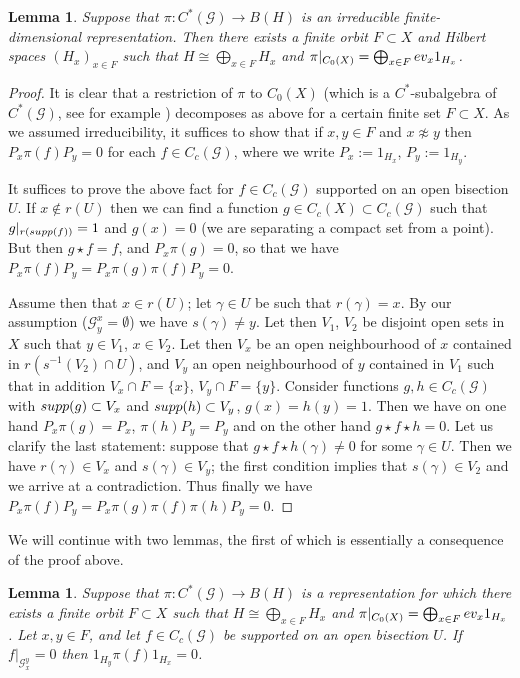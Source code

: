 \documentclass[11 pt, leqno, hidelinks]{amsart}%
\theoremstyle{plain}
\newtheorem{lemma}[theorem]{Lemma}
\numberwithin{equation}{section}
\newcommand{\G}{\mathcal{G}}
\newcommand{\GG}{\mathcal{G}}
\newcommand{\supp}{\textup{supp}}
\begin{document}
\begin{lemma} \label{lem:finiteorbit}
	Suppose  that $\pi:C^*(\GG)\to B(H)$ is an irreducible finite-dimensional representation. Then there exists a finite orbit $F\subset  X$ and Hilbert spaces $(H_x)_{x \in F}$ such that $H \cong \bigoplus_{x\in F} H_x$ and $\pi|_{C_0(X)} = \bigoplus_{x \in F} \textup{ev}_x 1_{H_x}$.
\end{lemma}
\begin{proof}
It is clear that a restriction of $\pi$ to $C_0(X)$ (which is a $C^*$-subalgebra of $C^*(\GG)$, see for example \cite[Proposition 4.2.6 and Corollary 9.3.4]{Aidan})
decomposes as above for a certain finite set $F\subset X$. As we assumed irreducibility, it suffices to show that if $x, y \in F$ and $x\not \approx y$ 	then $P_x \pi(f) P_y = 0$ for each $f \in C_c(\GG)$, where we write $P_x:=1_{H_x}$, $P_y:=1_{H_y}$.

It suffices to prove the above fact for $f\in C_c(\GG)$ supported on an open bisection $U$. If $x \notin r(U)$ then we can find a function $g\in C_c(X)\subset C_c(\GG)$ such that $g|_{r(\supp(f))}=1$ and $g(x)=0$ (we are separating a compact set from a point). But then $g \star f = f$, and $P_x \pi(g) =0$, so that we have $P_x \pi(f) P_y = P_x \pi(g) \pi(f) P_y = 0$.


Assume then that $x \in r(U)$; let $\gamma\in U$ be such that $r(\gamma)=x$. By our assumption ($\G_y^x=\emptyset$) we have $s(\gamma)\neq y$. Let then $V_1$, $V_2$ be disjoint open sets in $X$ such that $y\in V_1$, $x\in V_2$.  Let then $V_x$ be an open neighbourhood of $x$ contained in $r(s^{-1}(V_2) \cap U)$, and $V_y$ an open neighbourhood of $y$ contained in $V_1$ such that in addition $V_x \cap F = \{x\}$, $V_y \cap F =\{y\}$. Consider functions $g,h\in C_c(\GG)$ with $\supp(g)\subset V_x$ and $\supp(h)\subset V_y$, $g(x)=h(y)=1$. Then we have on one hand
$P_x \pi(g)=P_x$,  $\pi(h) P_y =P_y$ and on the other hand $g\star f \star h =0$. Let us clarify the last statement: suppose that $g\star f \star h(\gamma) \neq 0$ for some $\gamma \in U$. Then we have $r(\gamma) \in V_x$ and $s(\gamma) \in V_y$; the first condition implies  that $s(\gamma)\in V_2$ and we arrive at a contradiction.
Thus finally we have $P_x \pi(f) P_y = P_x \pi(g) \pi(f) \pi(h) P_y = 0$.
\end{proof}	

We will continue with two lemmas, the first of which is essentially a consequence of the proof above.



\begin{lemma} \label{lem:disjoint}
	Suppose  that $\pi:C^*(\GG)\to B(H)$ is a representation for which there exists a finite orbit $F\subset  X$ such that $H \cong \bigoplus_{x\in F} H_x$ and $\pi|_{C_0(X)} = \bigoplus_{x \in F} \textup{ev}_x 1_{H_x}$. Let $x,y \in F$, and let $f \in C_c(\GG)$ be supported on an open bisection $U$. If $f|_{\GG_x^y}=0$ then $1_{H_y} \pi(f) 1_{H_x} =0$.
\end{lemma}
\end{document}
